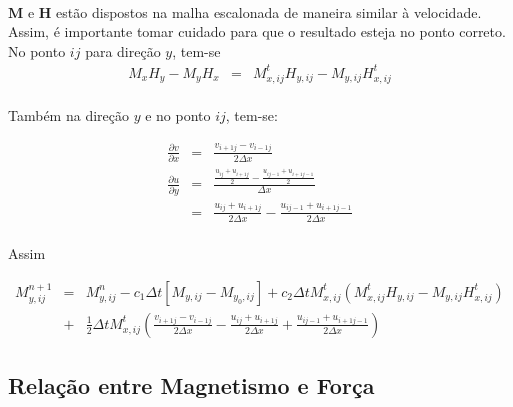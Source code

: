 \documentclass[eletromagnetismo.tex]{subfiles}
\begin{document}
\paragraph{} $\mathbf{M}$ e $\mathbf{H}$ estão dispostos na malha escalonada de maneira similar à velocidade. Assim, é importante tomar cuidado para que o resultado esteja no ponto correto. No ponto $ij$ para direção $y$, tem-se \begin{eqnarray}
M_x H_y - M_y H_x & = & M_{x,ij}^t H_{y,ij} - M_{y,ij} H_{x,ij}^t
\end{eqnarray}

\paragraph{} Também na direção $y$ e no ponto $ij$, tem-se:

\begin{eqnarray}
	\frac{\partial v}{\partial x} & = & \frac{v_{i+1j} - v_{i-1j}}{2\Delta x}\\
	\frac{\partial u}{\partial y} & = & \frac{\frac{u_{ij} + u_{i+1j}}{2} - \frac{u_{ij-1} + u_{i+1j-1}}{2}}{\Delta x}\\
	&=& \frac{u_{ij} + u_{i+1j}}{2\Delta x} - \frac{u_{ij-1} + u_{i+1j-1}}{2\Delta x}
\end{eqnarray}

\paragraph{} Assim

\begin{eqnarray}
M_{y,ij}^{n+1}
 & = & M_{y,ij}^n -c_1\Delta t[M_{y,ij} - M_{y_0,ij}]+c_2\Delta t M_{x,ij}^t(M_{x,ij}^t H_{y,ij} - M_{y,ij} H_{x,ij}^t)\nonumber \\
 &+&\frac{1}{2}\Delta tM_{x,ij}^t\left(\frac{v_{i+1j} - v_{i-1j}}{2\Delta x} - \frac{u_{ij} + u_{i+1j}}{2\Delta x} + \frac{u_{ij-1} + u_{i+1j-1}}{2\Delta x}\right)\label{Mynext}
\end{eqnarray}

\subsection{Relação entre Magnetismo e Força}
\end{document}

